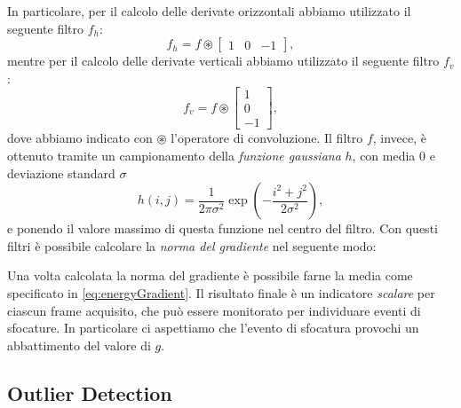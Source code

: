 \documentclass{llncs}
\begin{document}
In particolare, per il calcolo delle derivate orizzontali  abbiamo utilizzato il seguente filtro $f_h$:
\[f_h = f \circledast \left[ \begin{array}{rcl}
1 & 0 & -1
\end{array}\right], \] 
mentre per il calcolo delle derivate verticali abbiamo utilizzato il seguente filtro $f_v$:
\[f_v = f \circledast \left[ \begin{array}{r}
1 \\ 0 \\ -1
\end{array}\right], \]
dove abbiamo indicato con $\circledast$ l'operatore di convoluzione.
Il filtro $f$, invece, \`e ottenuto tramite un campionamento della \textit{funzione gaussiana} $h$, con media $0$ e deviazione standard $\sigma$
\begin{equation}
\label{eq:gaussian}
h(i,j)=\frac{1}{2\pi\sigma^2}\exp\left(-\frac{i^2+j^2}{2\sigma^2}\right),
\end{equation}
e ponendo il valore massimo di questa funzione nel centro del filtro.
Con questi filtri \`e possibile calcolare la \textit{norma del gradiente} nel seguente modo:

Una volta calcolata la norma del gradiente \`e possibile farne la media come specificato in \eqref{eq:energyGradient}.
Il risultato finale \`e un indicatore \textit{scalare} per ciascun frame acquisito, che pu\`o essere monitorato per individuare eventi di sfocature. 
In particolare ci aspettiamo che l'evento di sfocatura provochi un abbattimento del valore di $g$.





%
%
%
%

\subsection{Outlier Detection}\label{subsec:MonitoringScheme}
\end{document}
